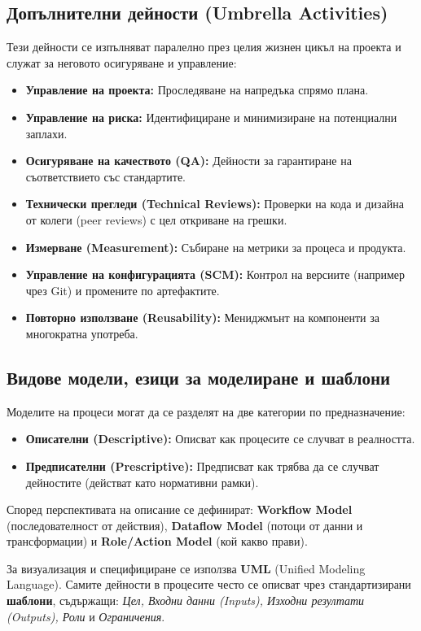\documentclass{scrartcl}
\begin{document}
\begin{FlushLeft}
\subsection{Допълнителни дейности (Umbrella Activities)}
Тези дейности се изпълняват паралелно през целия жизнен цикъл на проекта и служат за неговото осигуряване и управление:
\begin{itemize}
    \item \textbf{Управление на проекта:} Проследяване на напредъка спрямо плана.
    \item \textbf{Управление на риска:} Идентифициране и минимизиране на потенциални заплахи.
    \item \textbf{Осигуряване на качеството (QA):} Дейности за гарантиране на съответствието със стандартите.
    \item \textbf{Технически прегледи (Technical Reviews):} Проверки на кода и дизайна от колеги (peer reviews) с цел откриване на грешки.
    \item \textbf{Измерване (Measurement):} Събиране на метрики за процеса и продукта.
    \item \textbf{Управление на конфигурацията (SCM):} Контрол на версиите (например чрез Git) и промените по артефактите.
    \item \textbf{Повторно използване (Reusability):} Мениджмънт на компоненти за многократна употреба.
\end{itemize}

\subsection{Видове модели, езици за моделиране и шаблони}
Моделите на процеси могат да се разделят на две категории по предназначение:
\begin{itemize}
    \item \textbf{Описателни (Descriptive):} Описват как процесите се случват в реалността.
    \item \textbf{Предписателни (Prescriptive):} Предписват как трябва да се случват дейностите (действат като нормативни рамки).
\end{itemize}
Според перспективата на описание се дефинират: \textbf{Workflow Model} (последователност от действия), \textbf{Dataflow Model} (потоци от данни и трансформации) и \textbf{Role/Action Model} (кой какво прави).

За визуализация и специфициране се използва \textbf{UML} (Unified Modeling Language). Самите дейности в процесите често се описват чрез стандартизирани \textbf{шаблони}, съдържащи: \emph{Цел, Входни данни (Inputs), Изходни резултати (Outputs), Роли} и \emph{Ограничения}.


\end{FlushLeft}
\end{document}
